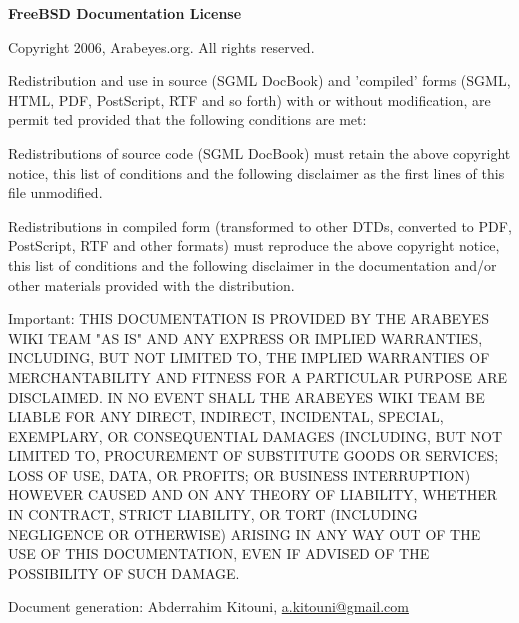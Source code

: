 \newpage
\begin{english}
\begin{center}
\textbf{FreeBSD Documentation License}
\end{center}
Copyright 2006, Arabeyes.org. All rights reserved.

Redistribution and use in source (SGML DocBook) and 'compiled' forms (SGML, HTML, PDF, PostScript, RTF and so forth) with or without modification, are permit
ted provided that the following conditions are met:

Redistributions of source code (SGML DocBook) must retain the above copyright notice, this list of conditions and the following disclaimer as the first lines
 of this file unmodified.

Redistributions in compiled form (transformed to other DTDs, converted to PDF, PostScript, RTF and other formats) must reproduce the above copyright notice, 
this list of conditions and the following disclaimer in the documentation and/or other materials provided with the distribution.

Important: THIS DOCUMENTATION IS PROVIDED BY THE ARABEYES WIKI TEAM "AS IS" AND ANY EXPRESS OR IMPLIED WARRANTIES, INCLUDING, BUT NOT LIMITED TO, THE IMPLIED
 WARRANTIES OF MERCHANTABILITY AND FITNESS FOR A PARTICULAR PURPOSE ARE DISCLAIMED. IN NO EVENT SHALL THE ARABEYES WIKI TEAM BE LIABLE FOR ANY DIRECT, INDIRECT, INCIDENTAL, SPECIAL, EXEMPLARY, OR CONSEQUENTIAL DAMAGES (INCLUDING, BUT NOT LIMITED TO, PROCUREMENT OF SUBSTITUTE GOODS OR SERVICES; LOSS OF USE, DATA, 
OR PROFITS; OR BUSINESS INTERRUPTION) HOWEVER CAUSED AND ON ANY THEORY OF LIABILITY, WHETHER IN CONTRACT, STRICT LIABILITY, OR TORT (INCLUDING NEGLIGENCE OR 
OTHERWISE) ARISING IN ANY WAY OUT OF THE USE OF THIS DOCUMENTATION, EVEN IF ADVISED OF THE POSSIBILITY OF SUCH DAMAGE.
\vspace{1 cm}

Document generation: Abderrahim Kitouni, \url{a.kitouni@gmail.com}
\end{english}

